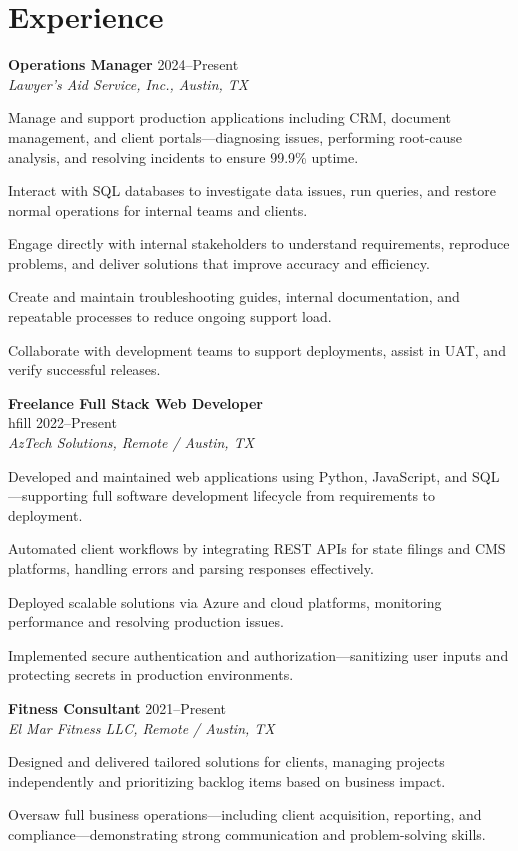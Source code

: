 \documentclass[letterpaper,10pt]{article}
\newcommand{\resumeItem}[1]{\item \small{#1}}
\begin{document}
\section*{Experience}
\begin{compactitem}
  \item[]
    \textbf{Operations Manager} \hfill 2024–Present \\
    \textit{Lawyer's Aid Service, Inc., Austin, TX}
    
    \begin{compactitem}[leftmargin=0.15in]
      \resumeItem{Manage and support production applications including CRM, document management, and client portals—diagnosing issues, performing root-cause analysis, and resolving incidents to ensure 99.9\% uptime.}
      \resumeItem{Interact with SQL databases to investigate data issues, run queries, and restore normal operations for internal teams and clients.}
      \resumeItem{Engage directly with internal stakeholders to understand requirements, reproduce problems, and deliver solutions that improve accuracy and efficiency.}
      \resumeItem{Create and maintain troubleshooting guides, internal documentation, and repeatable processes to reduce ongoing support load.}
      \resumeItem{Collaborate with development teams to support deployments, assist in UAT, and verify successful releases.}
    \end{compactitem}

  \item[]
    \textbf{Freelance Full Stack Web Developer} \\hfill 2022–Present \\
    \textit{AzTech Solutions, Remote / Austin, TX}
    
    \begin{compactitem}[leftmargin=0.15in]
      \resumeItem{Developed and maintained web applications using Python, JavaScript, and SQL—supporting full software development lifecycle from requirements to deployment.}
      \resumeItem{Automated client workflows by integrating REST APIs for state filings and CMS platforms, handling errors and parsing responses effectively.}
      \resumeItem{Deployed scalable solutions via Azure and cloud platforms, monitoring performance and resolving production issues.}
      \resumeItem{Implemented secure authentication and authorization—sanitizing user inputs and protecting secrets in production environments.}
    \end{compactitem}

  \item[]
    \textbf{Fitness Consultant} \hfill 2021–Present \\
    \textit{El Mar Fitness LLC, Remote / Austin, TX}
    
    \begin{compactitem}[leftmargin=0.15in]
      \resumeItem{Designed and delivered tailored solutions for clients, managing projects independently and prioritizing backlog items based on business impact.}
      \resumeItem{Oversaw full business operations—including client acquisition, reporting, and compliance—demonstrating strong communication and problem-solving skills.}
    \end{compactitem}
\end{compactitem}
\end{document}
